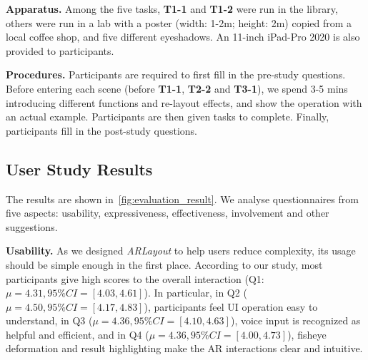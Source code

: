 \textbf{Apparatus.}
Among the five tasks, \textbf{T1-1} and \textbf{T1-2} were run in the library,
others were run in a lab with a poster (width: 1-2m; height: 2m) copied from a local coffee shop,
and five different eyeshadows. An 11-inch iPad-Pro 2020 is also provided
to participants.



\textbf{Procedures.}
Participants are required to first fill in the pre-study questions.
Before entering each scene (before \textbf{T1-1}, \textbf{T2-2} and \textbf{T3-1}), we spend 3-5 mins introducing
different functions and re-layout effects, and show the operation with an actual example.
Participants are then given tasks to complete.
Finally, participants fill in the post-study questions.


\subsection{User Study Results}
The results are shown in~\autoref{fig:evaluation_result}.
We analyse questionnaires from five aspects: usability, expressiveness, effectiveness,
involvement and other suggestions.

\textbf{Usability.} As we designed \textit{ARLayout} to help users reduce complexity,
its usage should be simple enough in the first place.
According to our study,
most participants give high scores to the overall interaction (Q1: $\mu = 4.31, 95\% CI = [4.03,4.61]$).
In particular, in Q2 ($\mu = 4.50, 95\% CI = [4.17,4.83]$), participants feel UI operation easy to understand,
in Q3 ($\mu = 4.36, 95\% CI = [4.10,4.63]$), voice input is recognized as helpful and efficient,
and in Q4 ($\mu = 4.36, 95\% CI = [4.00,4.73]$), fisheye deformation and result highlighting
make the AR interactions clear and intuitive.


